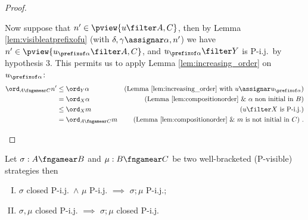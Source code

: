 \begin{proof}
\begin{enumerate}[i.]
Now suppose that $n' \in \pview{u\filter A,C}$,
then by Lemma \ref{lem:visibleatprefixofu}
(with $\delta,\gamma \assignar \alpha,n'$)
we have $n' \in \pview{u_{\prefixof \alpha}\filter A,C}$,
and $u_{\prefixof \alpha}\filter Y$ is P-i.j.\ by hypothesis 3. This permits us to apply Lemma \ref{lem:increasing_order} on $u_{\prefixof \alpha}$:
\begin{align*}
\ord_{A\fngamear C} n'
& \leq \ord_{Y} \alpha & \mbox{(Lemma \ref{lem:increasing_order} with $u\assignar u_{\prefixof \alpha}$)} \\
& = \ord_{X} \alpha & \mbox{(Lemma \ref{lem:compositionorder} \& $\alpha$ non initial in $B$)} \\
& \leq \ord_{X} m & \mbox{($u \filter X$ is P-i.j.)} \\
& = \ord_{A\fngamear C} m & \mbox{(Lemma \ref{lem:compositionorder} \& $m$ is not initial in $C$)} \ .
\end{align*}
\end{enumerate}
\end{proof}


\begin{proposition}
\label{prop:closedpijcompose} Let $\sigma : A \fngamear B$ and $\mu
: B \fngamear C$ be two well-bracketed (P-visible) strategies then
\begin{enumerate}[(I)]
\item $\sigma$ closed P-i.j.\ $\wedge$ $\mu$ P-i.j.
$\implies$ $\sigma ; \mu$  P-i.j.;
\item $\sigma, \mu$ closed P-i.j.
$\implies$ $\sigma ; \mu$ closed P-i.j.
\end{enumerate}
\end{proposition}

